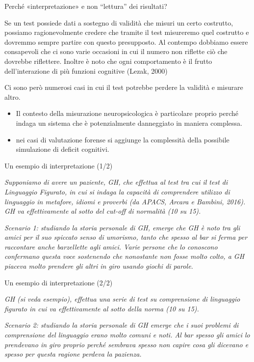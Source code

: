 \documentclass[
  ignorenonframetext,
]{beamer}
\providecommand{\tightlist}{%
  \setlength{\itemsep}{0pt}\setlength{\parskip}{0pt}}
\begin{document}
\begin{frame}{Perché «interpretazione» e non ``lettura'' dei risultati?}
\label{perchuxe9-interpretazione-e-non-lettura-dei-risultati}
\small

Se un test possiede dati a sostegno di validità che misuri un certo
costrutto, possiamo ragionevolmente credere che tramite il test
misureremo quel costrutto e dovremmo sempre partire con questo
presupposto. Al contempo dobbiamo essere consapevoli che ci sono varie
occasioni in cui il numero non riflette ciò che dovrebbe riflettere.
Inoltre è noto che ogni comportamento è il frutto dell'interazione di
più funzioni cognitive (Lezak, 2000)

Ci sono però numerosi casi in cui il test potrebbe perdere la validità e
misurare altro.

\begin{itemize}
\tightlist
\item
  Il contesto della misurazione neuropsicologica è particolare proprio
  perché indaga un sistema che è potenzialmente danneggiato in maniera
  complessa.\\
\item
  nei casi di valutazione forense si aggiunge la complessità della
  possibile simulazione di deficit cognitivi.
\end{itemize}
\end{frame}

\begin{frame}{Un esempio di interpretazione (1/2)}
\label{un-esempio-di-interpretazione-12}
\small

\emph{Supponiamo di avere un paziente, GH, che effettua al test tra cui
il test di Linguaggio Figurato, in cui si indaga la capacità di
comprendere utilizzo di linguaggio in metafore, idiomi e proverbi (da
APACS, Arcara e Bambini, 2016). GH va effettivamente al sotto del
cut-off di normalità (10 su 15).}

\emph{Scenario 1: studiando la storia personale di GH, emerge che GH è
noto tra gli amici per il suo spiccato senso di umorismo, tanto che
spesso al bar si ferma per raccontare anche barzellette agli amici.
Varie persone che lo conoscono confermano questa voce sostenendo che
nonostante non fosse molto colto, a GH piaceva molto prendere gli altri
in giro usando giochi di parole.}
\end{frame}

\begin{frame}{Un esempio di interpretazione (2/2)}
\label{un-esempio-di-interpretazione-22}
\small

\emph{GH (si veda esempio), effettua una serie di test su comprensione
di linguaggio figurato in cui va effettivamente al sotto della norma (10
su 15).}

\emph{Scenario 2: studiando la storia personale di GH emerge che i suoi
problemi di comprensione del linguaggio erano molto comuni e noti. Al
bar spesso gli amici lo prendevano in giro proprio perché sembrava
spesso non capire cosa gli dicevano e spesso per questa ragione perdeva
la pazienza.}
\end{frame}
\end{document}
